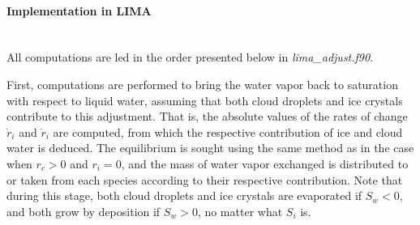 \paragraph{Implementation in LIMA}
~\\
All computations are led in the order presented below in \emph{lima\_adjust.f90}.

First, computations are performed to bring the water vapor back to saturation with respect to liquid water, assuming that both cloud droplets and ice crystals contribute to this adjustment. That is, the absolute values of the rates of change $\dot{r}_i$ and $\dot{r}_i$ are computed, from which the respective contribution of ice and cloud water is deduced. The equilibrium is sought using the same method as in the case when $r_c>0$ and $r_i=0$, and the mass of water vapor exchanged is distributed to or taken from each species according to their respective contribution. Note that during this stage, both cloud droplets and ice crystals are evaporated if $S_w<0$, and both grow by deposition if $S_w>0$, no matter what $S_i$ is.

